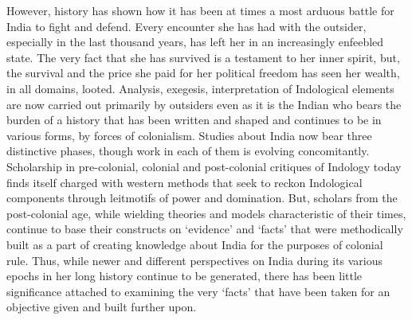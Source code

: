 However, history has shown how it has been at times a most arduous battle for India to fight and defend. Every encounter she has had with the outsider, especially in the last thousand years, has left her in an increasingly enfeebled state. The very fact that she has survived is a testament to her inner spirit, but, the survival and the price she paid for her political freedom has seen her wealth, in all domains, looted. Analysis, exegesis, interpretation of Indological elements are now carried out primarily by outsiders even as it is the Indian who bears the burden of a history that has been written and shaped and continues to be in various forms, by forces of colonialism. Studies about India now bear three distinctive phases, though work in each of them is evolving concomitantly. Scholarship in pre-colonial, colonial and post-colonial critiques of Indology today finds itself charged with western methods that seek to reckon Indological components through leitmotifs of power and domination. But, scholars from the post-colonial age, while wielding theories and models characteristic of their times, continue to base their constructs on ‘evidence’ and ‘facts’ that were methodically built as a part of creating knowledge about India for the purposes of colonial rule. Thus, while newer and different perspectives on India during its various epochs in her long history continue to be generated, there has been little significance attached to examining the very ‘facts’ that have been taken for an objective given and built further upon.

